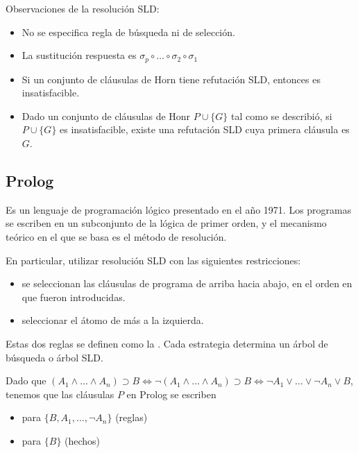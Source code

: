 Observaciones de la resolución SLD:
\begin{itemize}
  \item No se especifica regla de búsqueda ni de selección.
  \item La sustitución respuesta es $\sigma_p \circ \dots \circ \sigma_2 \circ \sigma_1$
  \item {} Si un conjunto de cláusulas de Horn tiene refutación SLD, entonces es insatisfacible.
  \item {} Dado un conjunto de cláusulas de Honr $P \cup \{G\}$ tal como se describió, si $P \cup \{G\}$ es insatisfacible, existe una refutación SLD cuya primera cláusula es $G$.
\end{itemize}

\subsection{Prolog}

Es un lenguaje de programación lógico presentado en el año 1971. Los programas se escriben en un subconjunto de la lógica de primer orden, y el mecanismo teórico en el que se basa es el método de resolución.

En particular, utilizar resolución SLD con las siguientes restricciones:
\begin{itemize}
  \item {} se seleccionan las cláusulas de programa de arriba hacia abajo, en el orden en que fueron introducidas.
  \item {} seleccionar el átomo de más a la izquierda.
\end{itemize}

Estas dos reglas se definen como la . Cada estrategia determina un árbol de búsqueda o árbol SLD.

Dado que $(A_1 \land \dots \land A_n) \supset B \iff \lnot (A_1 \land \dots \land A_n) \supset B \iff \lnot A_1 \lor \dots \lor \lnot A_n \lor B$, tenemos que las cláusulas $P$ en Prolog se escriben
\begin{itemize}
  \item {} para $\{B, A_1, \dots, \lnot A_n\}$ (reglas)
  \item {} para $\{B\}$ (hechos)
\end{itemize}

